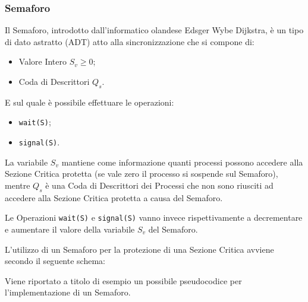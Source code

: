 \subsubsection{Semaforo}
Il Semaforo\cite{Semaforo}, introdotto dall'informatico olandese Edsger Wybe Dijkstra, è un tipo di dato astratto (ADT) atto alla sincronizzazione che si compone di:
\begin{itemize}
    \item Valore Intero $S_v \geq 0$;
    \item Coda di Descrittori $Q_s$.
\end{itemize}
E sul quale è possibile effettuare le operazioni:
\begin{itemize}
    \item \texttt{wait(S)};
    \item \texttt{signal(S)}.
\end{itemize}
La variabile $S_v$ mantiene come informazione quanti processi possono accedere alla Sezione Critica protetta (se vale zero il processo si sospende sul Semaforo), mentre $Q_s$ è una Coda di Descrittori dei Processi che non sono riusciti ad accedere alla Sezione Critica protetta a causa del Semaforo. \par
Le Operazioni \texttt{wait(S)} e \texttt{signal(S)} vanno invece rispettivamente a decrementare e aumentare il valore della variabile $S_v$ del Semaforo. \par
L'utilizzo di un Semaforo per la protezione di una Sezione Critica avviene secondo il seguente schema: \par

Viene riportato a titolo di esempio un possibile pseudocodice per l'implementazione di un Semaforo. \par

